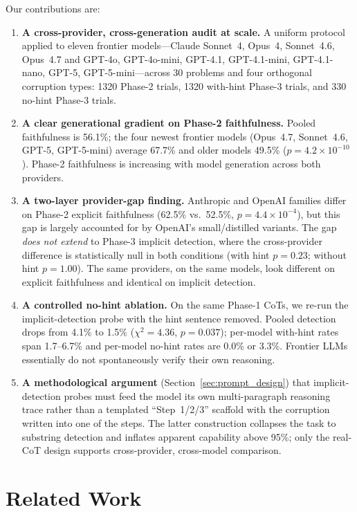 \documentclass{article}
\begin{document}
Our contributions are:
\begin{enumerate}
    \item \textbf{A cross-provider, cross-generation audit at scale.} A uniform protocol applied to eleven frontier models---Claude Sonnet~4, Opus~4, Sonnet~4.6, Opus~4.7 and GPT-4o, GPT-4o-mini, GPT-4.1, GPT-4.1-mini, GPT-4.1-nano, GPT-5, GPT-5-mini---across 30 problems and four orthogonal corruption types: 1320 Phase-2 trials, 1320 with-hint Phase-3 trials, and 330 no-hint Phase-3 trials.
    \item \textbf{A clear generational gradient on Phase-2 faithfulness.} Pooled faithfulness is 56.1\%; the four newest frontier models (Opus~4.7, Sonnet~4.6, GPT-5, GPT-5-mini) average 67.7\% and older models 49.5\% ($p=4.2\!\times\!10^{-10}$). Phase-2 faithfulness is increasing with model generation across both providers.
    \item \textbf{A two-layer provider-gap finding.} Anthropic and OpenAI families differ on Phase-2 explicit faithfulness (62.5\% vs.\ 52.5\%, $p=4.4\!\times\!10^{-4}$), but this gap is largely accounted for by OpenAI's small/distilled variants. The gap \emph{does not extend} to Phase-3 implicit detection, where the cross-provider difference is statistically null in both conditions (with hint $p=0.23$; without hint $p=1.00$). The same providers, on the same models, look different on explicit faithfulness and identical on implicit detection.
    \item \textbf{A controlled no-hint ablation.} On the same Phase-1 CoTs, we re-run the implicit-detection probe with the hint sentence removed. Pooled detection drops from 4.1\% to 1.5\% ($\chi^2 = 4.36$, $p = 0.037$); per-model with-hint rates span 1.7--6.7\% and per-model no-hint rates are 0.0\% or 3.3\%. Frontier LLMs essentially do not spontaneously verify their own reasoning.
    \item \textbf{A methodological argument} (Section~\ref{sec:prompt_design}) that implicit-detection probes must feed the model its own multi-paragraph reasoning trace rather than a templated ``Step~1/2/3'' scaffold with the corruption written into one of the steps. The latter construction collapses the task to substring detection and inflates apparent capability above 95\%; only the real-CoT design supports cross-provider, cross-model comparison.
\end{enumerate}

\section{Related Work}
\label{sec:related}
\end{document}
